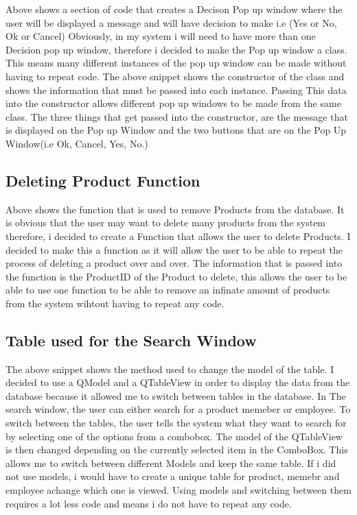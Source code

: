Above shows a section of code that creates a Decison Pop up window where the user will be displayed a message and will have decision to make i.e (Yes or No, Ok or Cancel)
Obviously, in my system i will need to have more than one Decision pop up window, therefore i decided to make the Pop up window a class. This means many different instances of the pop up window can be made without having to repeat code. The above snippet shows the constructor of the class and shows the information that must be passed into each instance. Passing This data into the constructor allows different pop up windows to be made from the same class. The three things that get passed into the constructor, are the message that is displayed on the Pop up Window and the two buttons that are on the Pop Up Window(i.e Ok, Cancel, Yes, No.)

\subsection{Deleting Product Function}
\begin{figure}[H]
\end{figure}
 Above shows the function that is used to remove Products from the database. It is obvious that the user may want to delete many products from the system therefore, i decided to create a Function that allows the user to delete Products. I decided to make this a function as it will allow the user to be able to repeat the process of deleting a product over and over. The information that is passed into the function is the ProductID of the Product to delete, this allows the user to be able to use one function to be able to remove an infinate amount of products from the system wihtout having to repeat any code.

\subsection{Table used for the Search Window}
\begin{figure}[H]
\end{figure}

The above snippet shows the method used to change the model of the table. I decided to use a QModel and a QTableView in order to display the data from the database because it allowed me to switch between tables in the database. In The search window, the user can either search for a product memeber or employee. To switch between the tables, the user tells the system what they want to search for by selecting one of the options from a combobox. The model of the QTableView is then changed depending on the currently selected item in the ComboBox. This allows me to switch between different Models and keep the same table. If i did not use models, i would have to create a unique table for product, memebr and employee achange which one is viewed. Using models and switching between them requires a lot less code and means i do not have to repeat any code.

